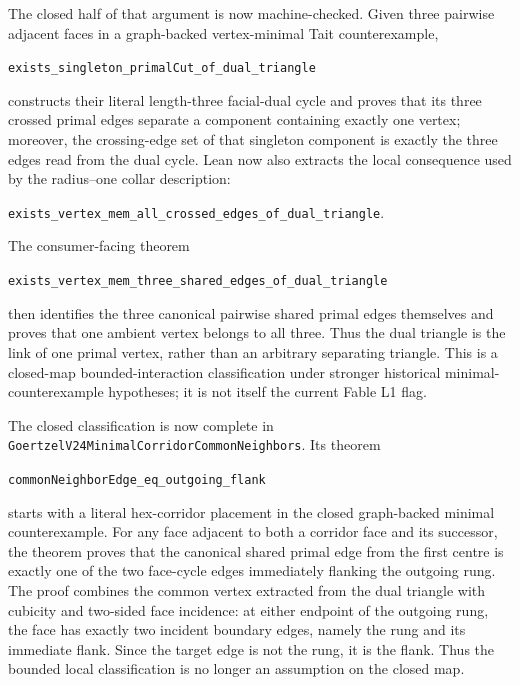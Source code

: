 \documentclass[11pt]{article}
\theoremstyle{definition}
\begin{document}
The closed half of that argument is now machine-checked.  Given three
pairwise adjacent faces in a graph-backed vertex-minimal Tait counterexample,


\begin{center}
\texttt{exists\_singleton\_primalCut\_of\_dual\_triangle}
\end{center}


constructs their literal length-three facial-dual cycle and proves that its
three crossed primal edges separate a component containing exactly one
vertex; moreover, the crossing-edge set of that singleton component is
exactly the three edges read from the dual cycle.  Lean now also extracts the
local consequence used by the radius--one collar description:

\begin{center}
\texttt{exists\_vertex\_mem\_all\_crossed\_edges\_of\_dual\_triangle}.
\end{center}

The consumer-facing theorem

\begin{center}
\texttt{exists\_vertex\_mem\_three\_shared\_edges\_of\_dual\_triangle}
\end{center}

then identifies the three canonical pairwise shared primal edges themselves
and proves that one ambient vertex belongs to all three.  Thus the dual
triangle is the link of one primal vertex, rather than an arbitrary separating
triangle.  This is a closed-map bounded-interaction classification under
stronger historical minimal-counterexample hypotheses; it is not itself the
current Fable L1 flag.

The closed classification is now complete in
\texttt{GoertzelV24MinimalCorridorCommonNeighbors}.  Its theorem

\begin{center}
\texttt{commonNeighborEdge\_eq\_outgoing\_flank}
\end{center}

starts with a literal hex-corridor placement in the closed graph-backed
minimal counterexample.  For any face adjacent to both a corridor face and
its successor, the theorem proves that the canonical shared primal edge from
the first centre is exactly one of the two face-cycle edges immediately
flanking the outgoing rung.  The proof combines the common vertex extracted
from the dual triangle with cubicity and two-sided face incidence: at either
endpoint of the outgoing rung, the face has exactly two incident boundary
edges, namely the rung and its immediate flank.  Since the target edge is not
the rung, it is the flank.  Thus the bounded local classification is no longer
an assumption on the closed map.
\end{document}
